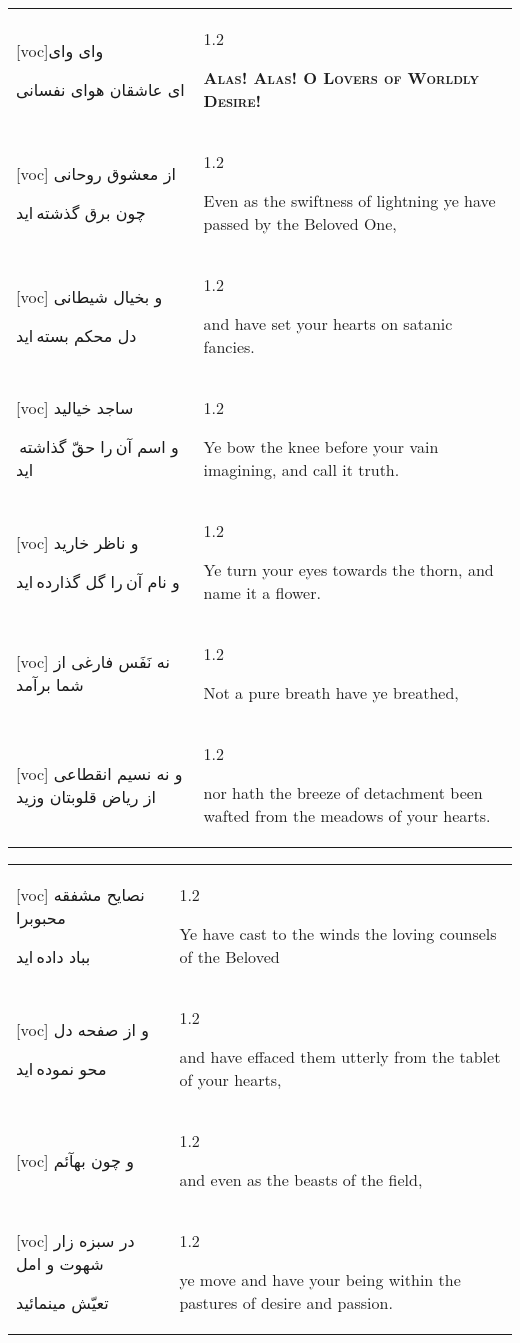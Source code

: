 \documentclass[11pt]{article}
\makeatletter
\newenvironment{orig}
  {\begin{farsi}[voc]}
  {\end{farsi}}
\newenvironment{trans}
  {\Large\begin{spacing}{1.2}\raggedright}
  {\end{spacing}}
\newenvironment{word}
  {\begin{tabular}[t]{p{2.75in}@{\hspace{3em}}p{2.75in}}}
  {\end{tabular}}
\newcommand{\ayat}[2]{\begin{orig}#1\end{orig} & \begin{trans}#2\end{trans}}
\newcommand{\heading}[2]{\textsc{\textbf{#1}} %
}
\makeatother
\begin{document}
\pagebreak

\begin{word}
\ayat{وای وای

ای عاشقان هوای نفسانی}{\heading{Alas!  Alas!  O Lovers of Worldly Desire!}{}} \\ \ayat{
از معشوق روحانی

چون برق گذشته ايد
}{Even as the swiftness of lightning ye have passed by the Beloved
  One,} \\ \ayat{
و بخيال شيطانی

دل محکم بسته ايد
}{and have set your hearts on satanic fancies.} \\ \ayat{
ساجد خياليد

و اسم آن را حقّ گذاشته ايد
}{Ye bow the knee before your vain imagining, and call it truth.} \\ \ayat{
و ناظر خاريد

و نام آن را گل گذارده ايد
}{Ye turn your eyes towards the thorn, and name it a flower.} \\ \ayat{
نه نَفَس فارغی از شما برآمد
}{Not a pure breath have ye breathed,} \vspace{-1ex}\\ \ayat{
و نه نسيم انقطاعی از رياض قلوبتان وزيد
}{nor hath the breeze of detachment been wafted from the meadows of your
  hearts.}
\end{word}

\pagebreak

\begin{word}
\ayat{
نصايح مشفقه محبوبرا

بباد داده ايد
}{Ye have cast to the winds the loving counsels of the Beloved} \vspace{-1ex}\\ \ayat{
و از صفحه دل

محو نموده ايد
}{and have effaced them utterly from the tablet of your hearts,} \vspace{-1ex}\\ \ayat{
و چون بهآئم
}{and even as the beasts of the field,} \vspace{-1ex}\\ \ayat{
در سبزه زار شهوت و امل

تعيّش مينمائيد
}{ye move and have your being within the pastures of desire and passion.}
\end{word}

\pagebreak
\end{document}
